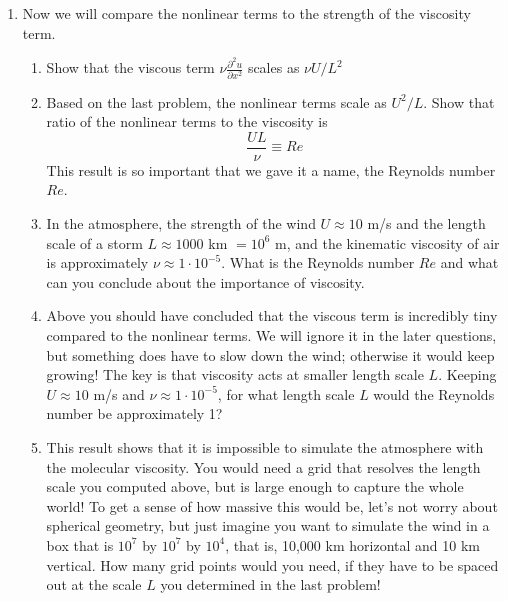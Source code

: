 \documentclass[letterpaper, 11pt]{article}
\newcommand{\1}{\mathds{1}}	%
\theoremstyle{definition}
\begin{document}
\begin{enumerate}[resume]
\begin{enumerate}[label=(\alph*)]
\textbf{(b)} With $w = W\hat{w}$, $z = H\hat{z}$:
\[
w\frac{\partial u}{\partial z} = W\hat{w} \cdot \frac{\partial(U\hat{u})}{\partial(H\hat{z})} \sim W \cdot \frac{U}{H} = \boxed{\frac{UW}{H}}
\]

\textbf{(c)} Scaling the non-divergence condition:
\[
\frac{\partial u}{\partial x} + \frac{\partial v}{\partial y} + \frac{\partial w}{\partial z} = 0
\]
\[
\frac{U}{L} + \frac{U}{L} + \frac{W}{H} = 0
\]

For the terms to balance: $\boxed{\frac{U}{L} \sim \frac{W}{H}}$, so $W \sim \frac{UH}{L}$.

\textbf{(d)} From part (c), $W \sim UH/L$, so:
\[
w\frac{\partial u}{\partial z} \sim \frac{UW}{H} = \frac{U \cdot (UH/L)}{H} = \frac{U^2}{L}
\]

All three nonlinear terms scale as $\boxed{\frac{U^2}{L}}$.


\end{enumerate}

\item Now we will compare the nonlinear terms to the strength of the viscosity term.

\begin{enumerate}[label=(\alph*)]
\item Show that the viscous term $\nu\frac{\partial^2 u}{\partial x^2}$ scales as $\nu U/L^2$
\item Based on the last problem, the nonlinear terms scale as $U^2/L$. Show that ratio of the nonlinear terms to the viscosity is
\[
\frac{UL}{\nu} \equiv Re
\]
This result is so important that we gave it a name, the Reynolds number $Re$.
\item In the atmosphere, the strength of the wind $U \approx 10$ m/s and the length scale of a storm $L \approx 1000$ km $= 10^6$ m, and the kinematic viscosity of air is approximately $\nu \approx 1 \cdot 10^{-5}$. What is the Reynolds number $Re$ and what can you conclude about the importance of viscosity.
\item Above you should have concluded that the viscous term is incredibly tiny compared to the nonlinear terms. We will ignore it in the later questions, but something does have to slow down the wind; otherwise it would keep growing! The key is that viscosity acts at smaller length scale $L$. Keeping $U \approx 10$ m/s and $\nu \approx 1 \cdot 10^{-5}$, for what length scale $L$ would the Reynolds number be approximately 1?
\item This result shows that it is impossible to simulate the atmosphere with the molecular viscosity. You would need a grid that resolves the length scale you computed above, but is large enough to capture the whole world! To get a sense of how massive this would be, let's not worry about spherical geometry, but just imagine you want to simulate the wind in a box that is $10^7$ by $10^7$ by $10^4$, that is, 10,000 km horizontal and 10 km vertical. How many grid points would you need, if they have to be spaced out at the scale $L$ you determined in the last problem!
\end{enumerate}


\end{enumerate}
\end{document}
